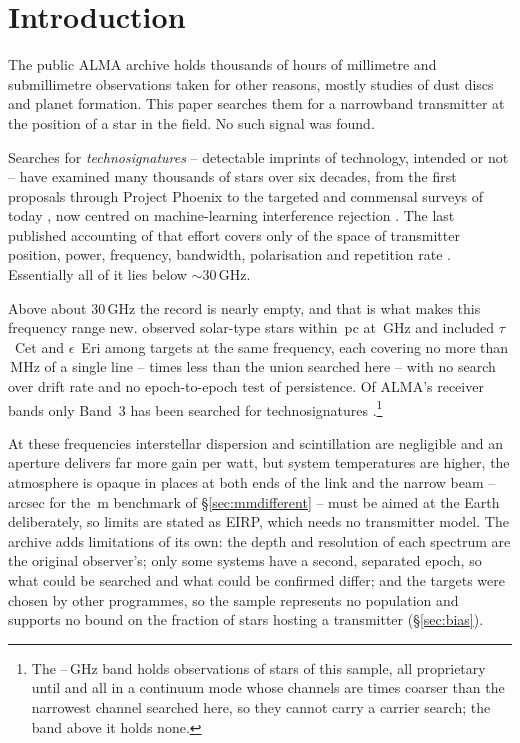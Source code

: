\section{Introduction}
\label{sec:intro}

The public ALMA archive holds thousands of hours of millimetre and
submillimetre observations taken for other reasons, mostly studies of dust
discs and planet formation. This paper searches them for a narrowband
transmitter at the position of a star in the field. No such signal was found.

Searches for \emph{technosignatures} -- detectable imprints of technology,
intended or not \citep{Sheikh2020,SETIreview2025} -- have examined many
thousands of stars over six decades, from the first proposals
\citep{CocconiMorrison1959,Drake1960} through Project Phoenix
\citep{Tarter2001,Backus2002} to the targeted and commensal surveys of today
\citep{Zhang2020,Czech2021,FAST3IATLAS2025,LOFARdualsite2023,Choza2024,Morrison2023,Tremblay2024,SRT2025},
now centred on machine-learning interference rejection
\citep{Ma2023,GLOBULAR2025,AnomalyParkesGBT2025}. The last published
accounting of that effort covers only \HaystackFrac{} of the space of
transmitter position, power, frequency, bandwidth, polarisation and repetition
rate \citep{Wright2018}. Essentially all of it lies below ${\sim}30$\,GHz.

Above about 30\,GHz the record is nearly empty, and that is what makes this
frequency range new. \citet{Steffes1994} observed \SbPriorNStarA{} solar-type
stars within \SbPriorDistA\,pc at \SbPriorFreqGHz\,GHz and
\citet{Mauersberger1996} included $\tau$~Cet and $\epsilon$~Eri among
\SbPriorNStarB{} targets at the same frequency, each covering no more than
\SbPriorBandMHz\,MHz of a single line -- \SbPriorRatio{} times less than the
union searched here -- with no search over drift rate and no
epoch-to-epoch test of persistence. Of ALMA's receiver bands only Band~3 has
been searched for technosignatures \citep{Mason2025}.\footnote{The
\SbBandOneLoGHz--\SbBandOneHiGHz\,GHz band holds observations of
\SbBoneNStar{} stars of this sample, all proprietary until \SbBoneRelYear{}
and all in a continuum mode whose channels are \SbBoneChanRatio{} times
coarser than the narrowest channel searched here, so they cannot carry a
carrier search; the band above it holds none.}

At these frequencies interstellar dispersion and scintillation are
negligible and an aperture delivers far more gain per watt, but system temperatures are
higher, the atmosphere is opaque in places at both ends of the link and the narrow beam --
\BmArcsec{} arcsec for the \BenchDiam\,m benchmark of
\S\ref{sec:mmdifferent} -- must be aimed at the Earth deliberately, so limits
are stated as EIRP, which needs no transmitter model. The archive adds
limitations of its own: the depth and resolution of each spectrum are the
original observer's; only some systems have a second,
separated epoch, so what could be searched and what could be confirmed
differ; and the targets were chosen by other programmes, so the sample
represents no population and supports no bound on the fraction of stars
hosting a transmitter \citep{Wright2018,Margot2023,EarthDetectingEarth2025}
(\S\ref{sec:bias}).

